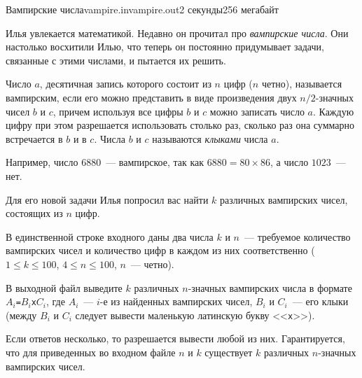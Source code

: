 \begin{problem}{Вампирские числа}{vampire.in}{vampire.out}{2 секунды}{256 мегабайт}


Илья увлекается математикой. Недавно он прочитал про \emph{вампирские числа}. Они настолько восхитили Илью, что
теперь он постоянно придумывает задачи, связанные с этими числами, и пытается их решить.

Число $a$, десятичная запись которого состоит из $n$ цифр ($n$ четно), называется вампирским, если его можно представить в виде 
произведения двух $n/2$-значных чисел $b$ и $c$, причем используя все цифры $b$ и $c$ 
можно записать число $a$. Каждую цифру при этом разрешается использовать столько раз, сколько
раз она суммарно встречается в $b$ и в $c$.
Числа $b$ и $c$ называются \textit{клыками} числа $a$.

Например,  число $6880$~--- вампирское, так как $6880 = 80 \times 86$,
а число $1023$~--- нет.

Для его новой задачи Илья попросил вас найти $k$ различных вампирских чисел, состоящих из $n$ цифр.

\InputFile
В единственной строке входного даны два числа $k$ и $n$~--- требуемое количество вампирских чисел и 
количество цифр в каждом из них соответственно ($1 \le k \le 100$, $4 \le n \le 100$, $n$~--- четно).

\OutputFile
В выходной файл выведите $k$ различных $n$-значных вампирских числа в формате \texttt{$A_i$=$B_{i}$x$C_{i}$}, где $A_i$~---
$i$-е из найденных вампирских чисел, $B_i$ и $C_i$~--- его клыки 
(между $B_i$ и $C_i$ следует вывести маленькую латинскую букву <<\texttt{x}>>). 

Если ответов несколько, то разрешается вывести любой из них.
Гарантируется, что для приведенных во входном файле $n$ и $k$ существует $k$ различных
$n$-значных вампирских чисел.

\Examples

\begin{example}%
%
%
\end{example}

\end{problem}
